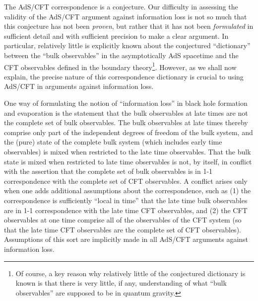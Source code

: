 \documentclass[12pt,nofootinbib,amsmath,amssymb,amsfonts,aps,prd,groupedaddress]{revtex4-1}
\begin{document}
The AdS/CFT correspondence is a conjecture. Our difficulty in assessing the
validity of the AdS/CFT argument against information loss is not so much that
this conjecture has not been {\it proven}, but rather that it has not been {\it
formulated} in sufficient detail and with sufficient precision to make a clear
argument. In particular, relatively little is explicitly known about the
conjectured ``dictionary'' between the ``bulk observables'' in the
asymptotically AdS spacetime and the CFT observables defined in the boundary
theory\footnote{Of course, a key reason why relatively little of the conjectured
dictionary is known is that there is very little, if any, understanding of what
``bulk observables'' are supposed to be in quantum gravity.}. However, as we
shall now explain, the precise nature of this correspondence dictionary is
crucial to using AdS/CFT in arguments against information loss.

One way of formulating the notion of ``information loss'' in black hole
formation and evaporation is the statement that the bulk observables at late
times are not the complete set of bulk observables.  The bulk observables at
late times thereby comprise only part of the independent degrees of freedom of
the bulk system, and the (pure) state of the complete bulk system (which
includes early time observables) is mixed when restricted to the late time
observables. That the bulk state is mixed when restricted to late time
observables is not, by itself, in conflict with the assertion that the complete
set of bulk observables is in 1-1 correspondence with the complete set of CFT
observables. A conflict arises only when one adds additional assumptions about
the correspondence, such as (1) the correspondence is sufficiently ``local in
time'' that the late time bulk observables are in 1-1 correspondence with the
late time CFT observables, and (2) the CFT observables at one time comprise all
of the observables of the CFT system (so that the late time CFT observables are
the complete set of CFT observables). Assumptions of this sort are implicitly
made in all AdS/CFT arguments against information loss.
\end{document}
